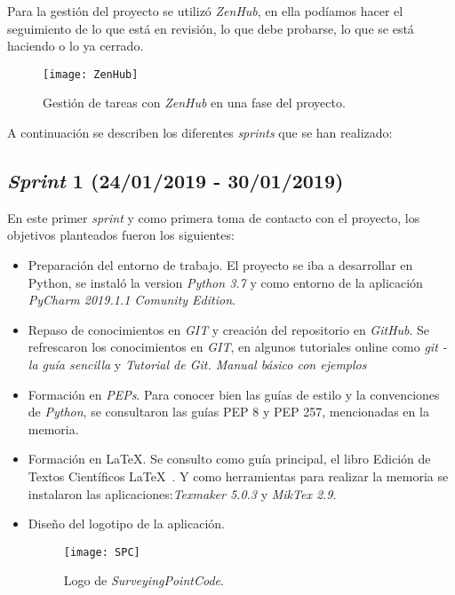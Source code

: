 Para la gestión del proyecto se utilizó \emph{ZenHub}, en ella podíamos hacer el seguimiento de lo que está en revisión, lo que debe probarse, lo que se está haciendo o lo ya cerrado.


\begin{figure}[H]
	\centering
	\texttt{[image: ZenHub]}
	\caption{Gestión de tareas con \emph{ZenHub} en una fase del proyecto.}
	\label{fig:ZenHub}
\end{figure}

A continuación se describen los diferentes \emph{sprints} que se han realizado:

\subsection{\emph{Sprint} 1 (24/01/2019 - 30/01/2019)}

En este primer \emph{sprint} y como primera toma de contacto con el proyecto, los objetivos planteados fueron los siguientes:

\begin{itemize}
\item Preparación del entorno de trabajo. El proyecto se iba a desarrollar en Python, se instaló la version \emph{Python 3.7} y como entorno de  la aplicación \emph{PyCharm 2019.1.1 Comunity Edition}.

\item Repaso de conocimientos en \emph{GIT} y creación del repositorio en \emph{GitHub}. Se refrescaron los conocimientos en \emph{GIT}, en algunos tutoriales  online como  \textit{git - la guía sencilla} \cite{git} y \textit{Tutorial de Git. Manual básico con ejemplos} \cite{git_1}

\item Formación en \emph{PEPs}. Para conocer bien las guías de estilo y la convenciones de \emph{Python}, se consultaron las guías PEP 8 y PEP 257, mencionadas en la memoria.

\item Formación en \LaTeX. Se consulto como guía principal, el libro Edición de Textos Científicos \LaTeX{}~\cite{latex}. Y como herramientas para realizar la memoria se instalaron las aplicaciones:\emph{Texmaker 5.0.3} y \emph{MikTex 2.9}.

\item Diseño del logotipo de la aplicación.

\begin{figure}[H]
	\centering
	\texttt{[image: SPC]}
	\caption{Logo de \emph{SurveyingPointCode}.}
	\label{fig:SPC}
\end{figure}
 
\end{itemize}


